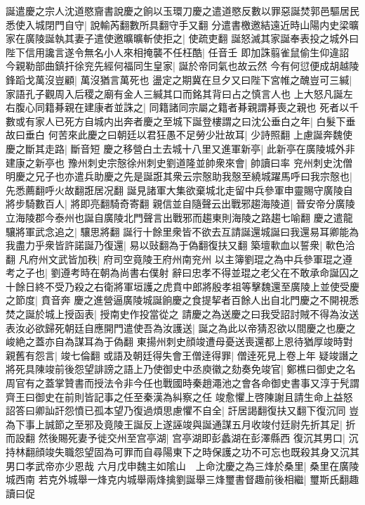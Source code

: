 誕遣慶之宗人沈道愍齎書說慶之餉以玉環刀慶之遣道愍反數以罪惡誕焚郭邑驅居民悉使入城閉門自守|{
	說輸芮翻數所具翻守手又翻}
分遣書檄邀結遠近時山陽内史梁曠家在廣陵誕執其妻子遣使邀曠曠斬使拒之|{
	使疏吏翻}
誕怒滅其家誕奉表投之城外曰陛下信用讒言遂令無名小人來相掩襲不任枉酷|{
	任音壬}
即加誅翦雀鼠偷生仰違詔今親勒部曲鎮扞徐兖先經何福同生皇家|{
	誕於帝同氣也故云然}
今有何愆便成胡越陵鋒蹈戈萬沒豈顧|{
	萬沒猶言萬死也}
盪定之期冀在旦夕又曰陛下宮帷之醜豈可三緘|{
	家語孔子觀周入后稷之廟有金人三緘其口而銘其背曰占之慎言人也}
上大怒凡誕左右腹心同籍朞親在建康者並誅之|{
	同籍諸同宗屬之籍者朞親謂朞喪之親也}
死者以千數或有家人已死方自城内出奔者慶之至城下誕登樓謂之曰沈公垂白之年|{
	白髮下垂故曰垂白}
何苦來此慶之曰朝廷以君狂愚不足勞少壯故耳|{
	少詩照翻}
上慮誕奔魏使慶之斷其走路|{
	斷音短}
慶之移營白土去城十八里又進軍新亭|{
	此新亭在廣陵城外非建康之新亭也}
豫州刺史宗慤徐州刺史劉道隆並帥衆來會|{
	帥讀曰率}
兖州刺史沈僧明慶之兄子也亦遣兵助慶之先是誕誑其衆云宗慤助我慤至繞城躍馬呼曰我宗慤也|{
	先悉薦翻呼火故翻誑居况翻}
誕見諸軍大集欲棄城北走留中兵參軍申靈賜守廣陵自將步騎數百人|{
	將即亮翻騎奇寄翻}
親信並自隨聲云出戰邪趨海陵道|{
	晉安帝分廣陵立海陵郡今泰州也誕自廣陵北門聲言出戰邪而趨東則海陵之路趨七喻翻}
慶之遣龍驤將軍武念追之|{
	驤思將翻}
誕行十餘里衆皆不欲去互請誕還城誕曰我還易耳卿能為我盡力乎衆皆許諾誕乃復還|{
	易以䜴翻為于偽翻復扶又翻}
築壇㰱血以誓衆|{
	㰱色洽翻}
凡府州文武皆加秩|{
	府司空竟陵王府州南兖州}
以主簿劉琨之為中兵參軍琨之遵考之子也|{
	劉遵考時在朝為尚書右僕射}
辭曰忠孝不得並琨之老父在不敢承命誕囚之十餘日終不受乃殺之右衛將軍垣護之虎賁中郎將殷孝祖等擊魏還至廣陵上並使受慶之節度|{
	賁音奔}
慶之進營逼廣陵城誕餉慶之食提挈者百餘人出自北門慶之不開視悉焚之誕於城上授函表|{
	授南史作投當從之}
請慶之為送慶之曰我受詔討賊不得為汝送表汝必欲歸死朝廷自應開門遣使吾為汝護送|{
	誕之為此以帝猜忍欲以間慶之也慶之峻絶之蓋亦自為謀耳為于偽翻}
東揚州刺史顔竣遭母憂送喪還都上恩待猶厚竣時對親舊有怨言|{
	竣七倫翻}
或語及朝廷得失會王僧逹得罪|{
	僧逹死見上卷上年}
疑竣譖之將死具陳竣前後怨望誹謗之語上乃使御史中丞庾徽之劾奏免竣官|{
	鄭樵曰御史之名周官有之蓋掌贊書而授法令非今任也戰國時秦趙澠池之會各命御史書事又淳于髠謂齊王曰御史在前則皆記事之任至秦漢為糾察之任}
竣愈懼上啓陳謝且請生命上益怒詔答曰卿訕訐怨憤已孤本望乃復過煩思慮懼不自全|{
	訐居謁翻復扶又翻下復沉同}
豈為下事上誠節之至邪及竟陵王誕反上遂誣竣與誕通謀五月收竣付廷尉先折其足|{
	折而設翻}
然後賜死妻予徙交州至宫亭湖|{
	宫亭湖即彭蠡湖在彭澤縣西}
復沉其男口|{
	沉持林翻顔竣失職怨望固為可罪而自尋陽東下之時保護之功不可忘也既殺其身又沉其男口孝武帝亦少恩哉}
六月戊申魏主如隂山　上命沈慶之為三烽於桑里|{
	桑里在廣陵城西南}
若克外城舉一烽克内城舉兩烽擒劉誕舉三烽璽書督趣前後相繼|{
	璽斯氏翻趣讀曰促}
